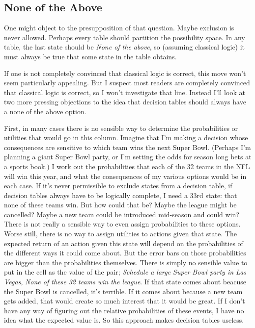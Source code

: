 \documentclass[
  12pt,
  letterpaper,
]{scrbook}
\begin{document}
\subsection{None of the Above}\label{sec-none-of-the-above}

One might object to the presupposition of that question. Maybe exclusion
is never allowed. Perhaps every table should partition the possibility
space. In any table, the last state should be \emph{None of the above},
so (assuming classical logic) it must always be true that some state in
the table obtains.

If one is not completely convinced that classical logic is correct, this
move won't seem particularly appealing. But I suspect most readers are
completely convinced that classical logic is correct, so I won't
investigate that line. Instead I'll look at two more pressing objections
to the idea that decision tables should always have a none of the above
option.

First, in many cases there is no sensible way to determine the
probabilities or utilities that would go in this column. Imagine that
I'm making a decision whose consequences are sensitive to which team
wins the next Super Bowl. (Perhaps I'm planning a giant Super Bowl
party, or I'm setting the odds for season long bets at a sports book.) I
work out the probabilities that each of the 32 teams in the NFL will win
this year, and what the consequences of my various options would be in
each case. If it's never permissible to exclude states from a decision
table, if decision tables always have to be logically complete, I need a
33rd state: that none of these teams win. But how could that be? Maybe
the league might be cancelled? Maybe a new team could be introduced
mid-season and could win? There is not really a sensible way to even
assign probabilities to these options. Worse still, there is no way to
assign utilities to actions given that state. The expected return of an
action given this state will depend on the probabilities of the
different ways it could come about. But the error bars on those
probabilities are bigger than the probabilities themselves. There is
simply no sensible value to put in the cell as the value of the pair;
\emph{Schedule a large Super Bowl party in Las Vegas}, \emph{None of
these 32 teams win the league}. If that state comes about beacuse the
Super Bowl is cancelled, it's terrible. If it comes about because a new
team gets added, that would create so much interest that it would be
great. If I don't have any way of figuring out the relative
probabilities of these events, I have no idea what the expected value
is. So this approach makes decision tables useless.
\end{document}
